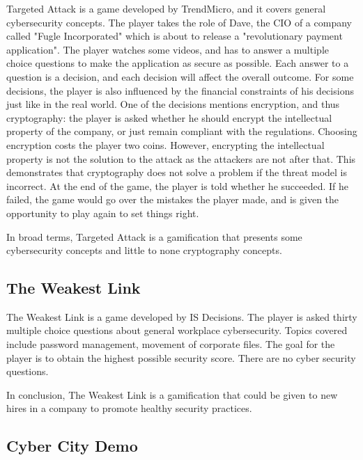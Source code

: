 \documentclass{l4proj}
\begin{document}
Targeted Attack is a game developed by TrendMicro, and it covers general cybersecurity concepts.
The player takes the role of Dave, the CIO of a company called "Fugle Incorporated" which is about to release a "revolutionary payment application".
The player watches some videos, and has to answer a multiple choice questions to make the application as secure as possible. 
Each answer to a question is a decision, and each decision will affect the overall outcome. 
For some decisions, the player is also influenced by the financial constraints of his decisions just like in the real world.
One of the decisions mentions encryption, and thus cryptography: the player is asked whether he should encrypt the intellectual property of the company, 
or just remain compliant with the regulations. Choosing encryption costs the player two coins. 
However, encrypting the intellectual property is not the solution to the attack as the attackers are not after that.
This demonstrates that cryptography does not solve a problem if the threat model is incorrect.
At the end of the game, the player is told whether he succeeded. If he failed, the game would go over the mistakes the player made, 
and is given the opportunity to play again to set things right.

In broad terms, Targeted Attack is a gamification that presents some cybersecurity concepts and little to none cryptography concepts.

\subsection{The Weakest Link}

The Weakest Link is a game developed by IS Decisions. The player is asked thirty multiple choice questions about general workplace cybersecurity.
Topics covered include password management, movement of corporate files. The goal for the player is to obtain the highest possible security score.
There are no cyber security questions.

In conclusion, The Weakest Link is a gamification that could be given to new hires in a company to promote healthy security practices.

\subsection{Cyber City Demo}
\end{document}
